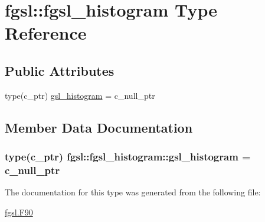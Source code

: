 \hypertarget{structfgsl_1_1fgsl__histogram}{}\section{fgsl\+:\+:fgsl\+\_\+histogram Type Reference}
\label{structfgsl_1_1fgsl__histogram}
\subsection*{Public Attributes}
\begin{DoxyCompactItemize}
\item 
type(c\+\_\+ptr) \hyperlink{structfgsl_1_1fgsl__histogram_ab9424b661b6155c5425ee2276c228cab}{gsl\+\_\+histogram} = c\+\_\+null\+\_\+ptr
\end{DoxyCompactItemize}


\subsection{Member Data Documentation}
\hypertarget{structfgsl_1_1fgsl__histogram_ab9424b661b6155c5425ee2276c228cab}{}
\subsubsection[{gsl\+\_\+histogram}]{\setlength{\rightskip}{0pt plus 5cm}type(c\+\_\+ptr) fgsl\+::fgsl\+\_\+histogram\+::gsl\+\_\+histogram = c\+\_\+null\+\_\+ptr}\label{structfgsl_1_1fgsl__histogram_ab9424b661b6155c5425ee2276c228cab}


The documentation for this type was generated from the following file\+:\begin{DoxyCompactItemize}
\item 
\hyperlink{fgsl_8F90}{fgsl.\+F90}\end{DoxyCompactItemize}
